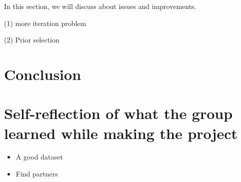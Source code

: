 \documentclass[a4paper]{artikel3}
\begin{document}
In this section, we will discuss about issues and improvements. 

(1) more iteration problem 

(2) Prior selection

\section{Conclusion}

\section{Self-reflection of what the group learned while making the project}

\begin{itemize}
\item A good dataset
\item Find partners
\end{itemize}
   


\begin{spacing}{1.5} 

\end{spacing}
\end{document}
